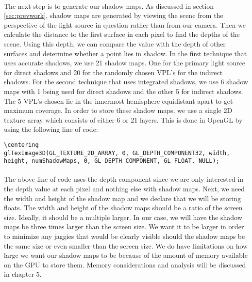 \paragraph{}
The next step is to generate our shadow maps.  As discussed in section \ref{sec:prevwork}, shadow maps are generated by viewing the scene from the perspective of the light source in question rather than from our camera.  Then we calculate the distance to the first surface in each pixel to find the depths of the scene.  Using this depth, we can compare the value with the depth of other surfaces and determine whether a point lies in shadow.  In the first technique that uses accurate shadows, we use 21 shadow maps. One for the primary light source for direct shadows and 20 for the randomly chosen VPL's for the indirect shadows.  For the second technique that uses integrated shadows, we use 6 shadow maps with 1 being used for direct shadows and the other 5 for indirect shadows.  The 5 VPL's chosen lie in the innermost hemisphere equidistant apart to get maximum coverage.  In order to store these shadow maps, we use a single 2D texture array which consists of either 6 or 21 layers.  This is done in OpenGL by using the following line of code:

\begin{lstlisting}
\centering
glTexImage3D(GL_TEXTURE_2D_ARRAY, 0, GL_DEPTH_COMPONENT32, width, 
height, numShadowMaps, 0, GL_DEPTH_COMPONENT, GL_FLOAT, NULL);
\end{lstlisting}
\paragraph{}
The above line of code uses the depth component since we are only interested in the depth value at each pixel and nothing else with shadow maps.  Next, we need the width and height of the shadow map and we declare that we will be storing floats.  The width and height of the shadow maps should be a ratio of the screen size.  Ideally, it should be a multiple larger.  In our case, we will have the shadow maps be three times larger than the screen size.  We want it to be larger in order to minimize any jaggies that would be clearly visible should the shadow maps be the same size or even smaller than the screen size.  We do have limitations on how large we want our shadow maps to be because of the amount of memory available on the GPU to store them.  Memory considerations and analysis will be discussed in chapter 5.  

